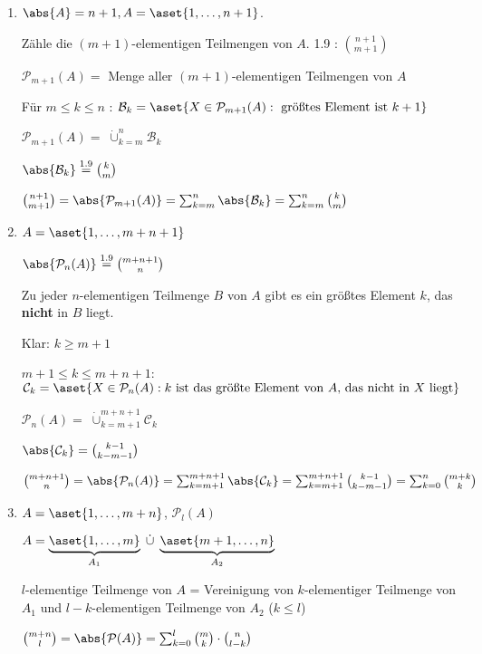 \begin{enumerate}
	
	\item 
	$\abs{A}= n+1, A = \aset{1, \dots, n+1}$.
	
	Zähle die $(m+1)$-elementigen Teilmengen von $A$. 
	1.9 %
	: $\binom{n+1}{m+1}$
	
	$\mathcal{P}_{m+1}(A) = $ Menge aller $(m+1)$-elementigen Teilmengen von $A$
	
	Für $m \leq k \leq n$ : 
	$\mathcal{B}_k = \aset{X \in \mathcal{P}_{m+1}(A) : \text{ größtes Element ist } k+1  }  $
	
	
	$\mathcal{P}_{m+1}(A) = \;\dot{\cup}_{k=m}^n\mathcal{B}_k\;$ %
	
	
	$\abs{\mathcal{B}_k} \stackrel{1.9}{=} %
	 \binom{k}{m} $

	$\binom{n+1}{m+1} = \abs{\mathcal{P}_{m+1}(A)} 
	                  = \sum_{k=m}^{n}\abs{\mathcal{B}_k}
	                  = \sum_{k=m}^{n}\binom{k}{m} $
	                  
	 \item
	 $A = \aset{1, \dots, m+ n + 1}$
	 
	 $\abs{\mathcal{P}_n(A)} \stackrel{1.9}{=} %
	 \binom{m + n + 1}{n}
	 $                 
	 
	 Zu jeder $n$-elementigen Teilmenge $B$ von $A$ gibt es ein größtes Element $k$, das \textbf{nicht} in $B$ liegt. 
	 
	 Klar: $k \geq m+1$
	 
	 $m + 1 \leq k \leq m + n + 1$:
	 $\mathcal{C}_k = \aset{X \in \mathcal{P}_n(A) : k \text{ ist das größte Element von } A \text{, das nicht in } X \text{ liegt}}$
	 
	 $\mathcal{P}_n(A) = \;\dot{\cup}_{k=m+1}^{m+n+1}\mathcal{C}_k\;$ %
	 
	 $\abs{\mathcal{C}_k} = \binom{k-1}{k-m-1} $
	 
	 $\binom{m+n+1}{n} = \abs{\mathcal{P}_n (A)}
	                   = \sum_{k=m+1}^{m+n+1}\abs{\mathcal{C}_k}
	                   = \sum_{k=m+1}^{m+n+1}\binom{k-1}{k-m-1}
	                   = \sum_{k=0}^{n}\binom{m+k}{k}
	                    $
	 
	                  	
	\item
	
	$A = \aset{1, \dots, m+n}$, $\mathcal{P}_l(A)$
	
	$A = \underbrace{\aset{1, \dots, m}}_{A_1} \;\dot{\cup}\; \underbrace{\aset{m+1, \dots, n}}_{A_2} $
	
	 $l$-elementige Teilmenge von $A$ = Vereinigung von $k$-elementiger Teilmenge von $A_1$ und $l-k$-elementigen Teilmenge von $A_2$ ($k\leq l$)
	
	$\binom{m+n}{l} = \abs{\mathcal{P}(A)} = \sum_{k = 0}^{l} \binom{m}{k} \cdot \binom{n}{l-k}$
	
\end{enumerate}
